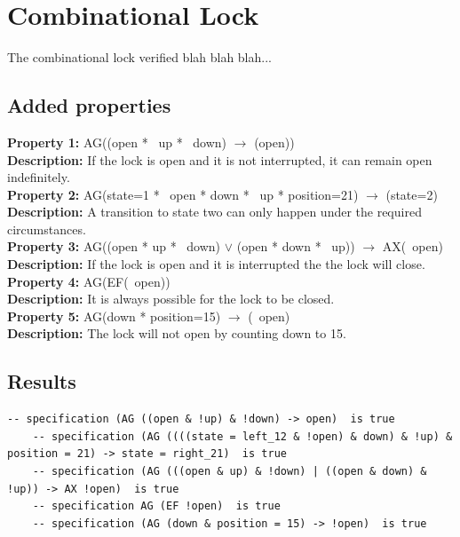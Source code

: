 \documentclass[11pt]{article}
\begin{document}


\section{Combinational Lock}
The combinational lock verified blah blah blah...
	
	\subsection{Added properties}
	
	

	\textbf{Property 1:} AG((open * ~up * ~down) $\to$ (open)) 	\\	
	\textbf{Description:} If the lock is open and it is not interrupted, it can remain open indefinitely. \\
	\vspace{12pt}
	\textbf{Property 2:} AG(state=1 * ~open * down  * ~up * position=21) $\to$ (state=2)\\ 
	\textbf{Description:} A transition to state two can only happen under the required circumstances. \\
	\vspace{12pt}
	\textbf{Property 3:} AG((open * up * ~down) $\vee$  (open * down * ~up)) $\to$ AX(~open)\\ \textbf{Description:} If the lock is open and it is interrupted the the lock will close. \\
	\vspace{12pt}
	\textbf{Property 4:} AG(EF(~open)) \\
	\textbf{Description:} It is always possible for the lock to be closed.\\
	\vspace{12pt}
	\textbf{Property 5:} AG(down * position=15) $\to$ (~open) \\
	\textbf{Description:} The lock will not open by counting down to 15.\\

	
	\subsection{Results}
 \begin{lstlisting}[caption=NuSMV Output, label=p1_out]		
	-- specification (AG ((open & !up) & !down) -> open)  is true
	-- specification (AG ((((state = left_12 & !open) & down) & !up) & position = 21) -> state = right_21)  is true
	-- specification (AG (((open & up) & !down) | ((open & down) & !up)) -> AX !open)  is true
	-- specification AG (EF !open)  is true
	-- specification (AG (down & position = 15) -> !open)  is true

  \end{lstlisting}
	
\end{document}
